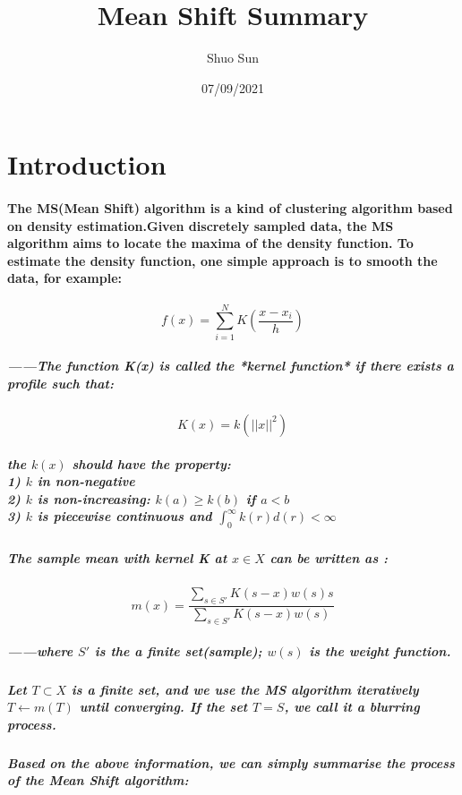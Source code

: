\documentclass{article}
\title{Mean Shift Summary}
\author{Shuo Sun}
\date{07/09/2021}
\begin{document}
\maketitle

\section{Introduction}
\paragraph{
The MS(Mean Shift) algorithm is a kind of clustering algorithm based on density estimation.Given discretely sampled data, the MS algorithm aims to locate the maxima of the density function. To estimate the density function, one simple approach is to smooth the data, for example:
}
\begin{equation}
f(x) = \sum_{i=1}^{N}K(\frac{x-x_i}{h})
\end{equation}
\subparagraph{
——The function K(x) is called the *kernel function* if there exists a profile such that:
}
\begin{equation}
K(x) = k(||x||^2)
\end{equation}

\subparagraph{
the $k(x)$ should have the property:\\
1) $k$ in non-negative\\
2) $k$ is non-increasing: $k(a) \geq k(b)$ if $a < b$\\
3) $k$ is piecewise continuous and $\int_{0}^{\infty}k(r)d(r) < \infty $
}

\subparagraph{
The sample mean with kernel K at $x \in X$ can be written as :
}

\begin{equation}
m(x) = \frac{\sum_{s\in S'}K(s-x)w(s)s}{\sum_{s \in S'}K(s-x)w(s)}
\end{equation}

\subparagraph{
——where $S'$ is the a finite set(sample); $w(s)$ is the weight function.
}

\subparagraph{
Let $T \subset  X$ is a finite set, and we use the MS algorithm iteratively  $T \leftarrow m(T)$ until converging.  If the set $T = S$, we call it a blurring process.
}
\subparagraph{
Based on the above information, we can simply summarise the process of the Mean Shift algorithm:
}
\end{document}
